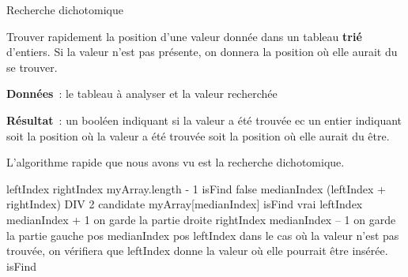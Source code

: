 \begin{Fiche}{Recherche dichotomique}
\label{fiche:dicho}


	Trouver rapidement la position d’une valeur donnée dans un tableau
	\textbf{trié} d’entiers.  Si la valeur n’est pas présente, on donnera la
	position où elle aurait du se trouver.

	
	\textbf{Données}~: 
		le tableau à analyser
		et la valeur recherchée
		
	\textbf{Résultat}~:
		un booléen indiquant si la valeur a été trouvée
		ec un entier indiquant
			soit la position où la valeur a été trouvée
			soit la position où elle aurait du être.


		L’algorithme rapide que nous avons vu est la recherche
		dichotomique.
		
		\begin{pseudocode}
				\Empty
				\Let leftIndex 
				\Let rightIndex \Gets myArray.length - 1
				\Let isFind \Gets false
				\Empty
					\Let medianIndex \Gets (leftIndex + rightIndex) DIV 2
					\Let candidate \Gets myArray[medianIndex]
						\Let isFind \Gets vrai
						\Let leftIndex \Gets medianIndex + 1
						\RComment on garde la partie droite
					\Else
						\Let rightIndex \Gets medianIndex – 1
						\RComment on garde la partie gauche
					\EndIf
				\EndWhile
				\Empty
					\Let pos \Gets medianIndex
				\Else
					\Let pos \Gets leftIndex
					\RComment dans le cas où la valeur n’est pas trouvée,
					\Empty 
					\RComment on vérifiera que leftIndex donne la valeur 
					où elle pourrait être insérée.
				\EndIf
				\Empty
				\Return isFind
			\EndAlgo
		\end{pseudocode}
		
	
\end{Fiche}
